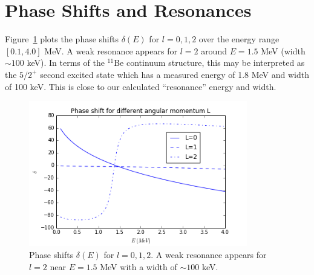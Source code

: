 \documentclass[]{scrartcl}
\begin{document}
\section*{Phase Shifts and Resonances}

Figure~\ref{fig:phase} plots the phase shifts $\delta(E)$ for $l=0,1,2$ over the energy range $[0.1,4.0]$ MeV. A weak resonance appears for $l=2$ around $E=1.5$ MeV (width $\sim 100$ keV). In terms of the $^{11}$Be continuum structure, this may be interpreted as the $5/2 ^+$ second excited state which has a measured energy of 1.8 MeV and width of 100 keV. This is close to our calculated ``resonance'' energy and width.

\begin{figure}
\centering
	\includegraphics[width=0.85\textwidth]{figures/phase.png}
	\caption{Phase shifts $\delta(E)$ for $l=0,1,2$. A weak resonance appears for $l=2$ near $E=1.5$ MeV with a width of $\sim 100$ keV.}
	\label{fig:phase}
\end{figure}




\end{document}
